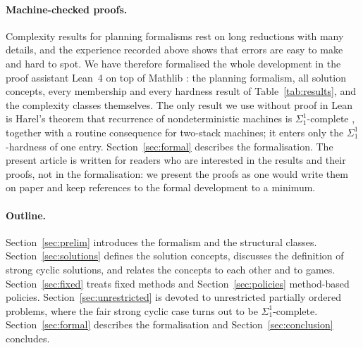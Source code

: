 \paragraph{Machine-checked proofs.}
Complexity results for planning formalisms rest on long reductions with many details, and the
experience recorded above shows that errors are easy to make and hard to spot. We have therefore
formalised the whole development in the proof assistant Lean~4
\parencite{moura:ullrich:cade-21} on top of Mathlib \parencite{mathlib:cpp-20}: the planning
formalism, all solution concepts, every membership and every hardness result of
Table~\ref{tab:results}, and the complexity classes themselves. The only result we use without
proof in Lean is Harel's theorem that recurrence of nondeterministic machines is
$\Sigma^1_1$-complete \parencite{harel:jacm-86}, together with a routine consequence for
two-stack machines; it enters only the $\Sigma^1_1$-hardness of one entry. Section~\ref{sec:formal}
describes the formalisation. The present article is written for readers who are interested in
the results and their proofs, not in the formalisation: we present the proofs as one would
write them on paper and keep references to the formal development to a minimum.

\paragraph{Outline.}
Section~\ref{sec:prelim} introduces the formalism and the structural classes.
Section~\ref{sec:solutions} defines the solution concepts, discusses the definition of strong
cyclic solutions, and relates the concepts to each other and to games.
Section~\ref{sec:fixed} treats fixed methods and Section~\ref{sec:policies} method-based
policies. Section~\ref{sec:unrestricted} is devoted to unrestricted partially ordered problems,
where the fair strong cyclic case turns out to be $\Sigma^1_1$-complete.
Section~\ref{sec:formal} describes the formalisation and Section~\ref{sec:conclusion} concludes.


